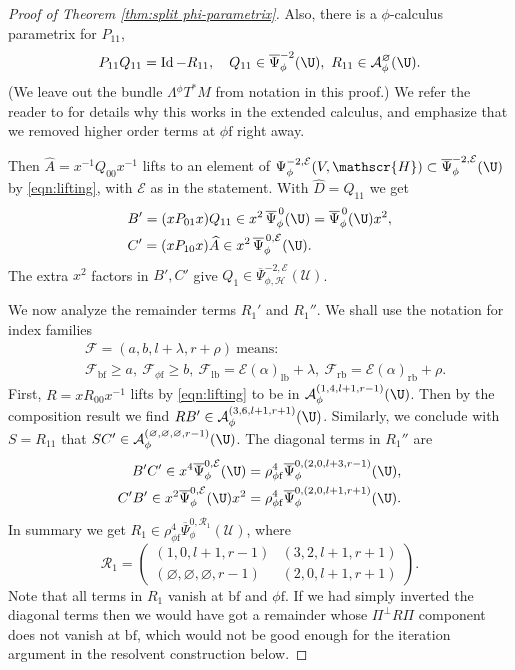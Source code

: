 \documentclass[JEP,XML,SOM,Unicode,NoFloatCountersInSection,published]{cedram}
\theoremstyle{plain}
\theoremstyle{definition}
\newcommand{\Umath}{{\mathscr{U}}}
\newcommand\calA{{\mathcal A}}
\newcommand\calE{{\mathcal E}}
\newcommand\calF{{\mathcal F}}
\newcommand{\calH}{{\mathscr{H}}}
\newcommand\calR{{\mathcal R}}
\newcommand{\phif}{{\phi\mathrm{f}}}
\newcommand{\lf}{{\mathrm{lb}}}
\newcommand{\rf}{{\mathrm{rb}}}
\newcommand{\bbf}{{\mathrm{bf}}}
\DeclareMathOperator{\Id}{Id}
\newcommand{\Piperp}{\Pi^\perp}
\newcommand{\Psibar}{\overline{\Psi}}
\begin{document}
\begin{proof}[Proof of Theorem \ref{thm:split phi-parametrix}]
Also, there is a $\phi$-calculus parametrix for $P_{11}$, \ie \begin{equation}
\label{eqn:Q11 R11}
P_{11}Q_{11}=\Id - R_{11},\quad
Q_{11}\in\Psibar^{-2}_\phi(\U),\ R_{11}\in \calA^{\varnothing}_{\phi} (\U).
\end{equation}
(We leave out the bundle $\Lambda {}^\phi T^*M$ from notation in this proof.)
We refer the reader to \cite[Prop.\,2]{grieser-para} for details why this works in the extended calculus,
and emphasize that we removed higher order terms at $\phif$ right away.

Then $\widehat{A}=x^{-1}Q_{00}x^{-1}$ lifts to an element of $\Psi_\phi^{-2,\calE}(V,\calH)\subset\Psibar_\phi^{-2,\calE}(\U)$
by \eqref{eqn:lifting}, with $\calE$ as in the statement. With $\widehat{D}=Q_{11}$ we get
\begin{align*}
&B'=(xP_{01}x) Q_{11}\in x^2\,\Psibar^{\,0}_\phi(\U)=\Psibar^{\,0}_\phi(\U) x^2, \\
&C'=(xP_{10}x) \widehat{A} \in x^2\,\Psibar_\phi^{\,0,\calE}(\U).
\end{align*}
The extra $x^2$ factors in $B',C'$ give $Q_1\in \Psibar_{\phi, \mathscr{H}}^{-2,\calE}(\Umath)$.

We now analyze the remainder terms $R_1'$ and $R_1''$.
We shall use the notation for index families
\begin{equation}
\label{eqn:index set tuples}
\begin{split}
&\calF = (a,b,l+\lambda,r+\rho) \ \text{means:}\\
&\calF_\bbf\geq a,\ \calF_\phif\geq b,\ \calF_\lf=\calE(\alpha)_\lf+\lambda,\ \calF_\rf=\calE(\alpha)_\rf+\rho.
\end{split}
\end{equation}
First, $R=xR_{00}x^{-1}$ lifts by \eqref{eqn:lifting}
to be in $\calA_{\phi}^{(1,4,l+1,r-1)}(\U)$. Then by the composition result
\cite[Th.\,9]{grieser-para} we find $RB' \in \calA_{\phi}^{(3,6,l+1,r+1)}(\U)$.
Similarly, we conclude with $S=R_{11}$ that $SC'\in \calA_{\phi}^{(\varnothing,\varnothing,\varnothing,r-1)}(\U)$.
The diagonal terms in $R_1''$ are
\begin{align*}
B'C'\in x^4\Psibar_\phi^{0,\calE}(\U)
&=\rho_\phif^4 \Psibar_\phi^{0,(2,0,l+3,r-1)}(\U), \\
C'B'\in x^2\Psibar_\phi^{0,\calE} (\U)x^2
&=\rho_\phif^4\Psibar_\phi^{0,(2,0,l+1,r+1)}(\U).
\end{align*}
In summary we get $R_1 \in \rho_\phif^4\Psibar_\phi^{0,\calR_1}(\Umath)$, where
\begin{equation}
\label{eqn:phi-param R1}
\calR_1 =
\begin{pmatrix}
(1,0,l+1,r-1) & (3,2,l+1,r+1) \\
(\varnothing,\varnothing,\varnothing,r-1) & (2,0,l+1,r+1)
\end{pmatrix}.
\end{equation}
Note that all terms in $R_1$ vanish at $\bbf$ and $\phif$. If we had simply inverted the
diagonal terms then we would have got a remainder whose $\Piperp R\Pi$ component
does not vanish at $\bbf$, which would not be good enough for the
iteration argument in the resolvent construction below.


\end{proof}
\end{document}
